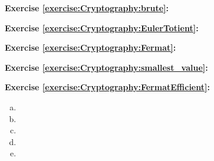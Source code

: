 \noindent\textbf{Exercise \ref{exercise:Cryptography:brute}:}

\noindent\textbf{Exercise \ref{exercise:Cryptography:EulerTotient}:}

\noindent\textbf{Exercise \ref{exercise:Cryptography:Fermat}:}

\noindent\textbf{Exercise \ref{exercise:Cryptography:smallest_value}:}

\noindent\textbf{Exercise \ref{exercise:Cryptography:FermatEfficient}:}
\begin{enumerate}[(a)]
\item
\item
\item
\item
\item
\end{enumerate}

